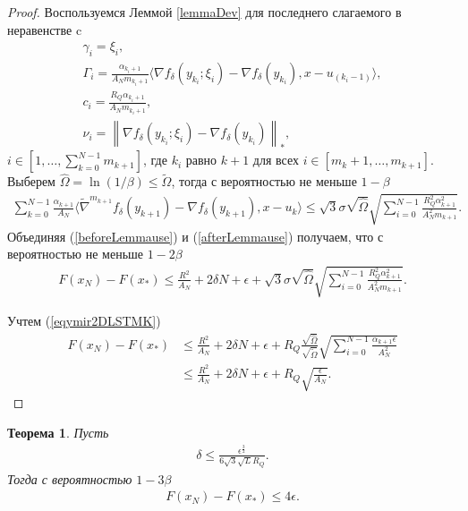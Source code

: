 \documentclass[11pt,a4]{article}
\newcommand{\norm}[1]{\left\lVert#1\right\rVert}
\newtheorem{theorem}{Теорема}
\begin{document}
\begin{proof}
	Воспользуемся Леммой \ref{lemmaDev} для последнего слагаемого в неравенстве c \begin{gather*}
	\gamma_i =\xi_i,\\
	\Gamma_i = \frac{\alpha_{k_i+1}}{A_N m_{k_i+1}}\langle\nabla f_\delta(y_{k_i};\xi_i) - \nabla f_\delta(y_{k_i}), x - u_{(k_i - 1)}\rangle,\\
	 c_{i} = \frac{R_Q\alpha_{k_i+1}}{A_N m_{k_i+1}},\\
	 \nu_i = \norm{\nabla f_\delta(y_{k_i};\xi_i) - \nabla f_\delta(y_{k_i})}_*,\end{gather*} 
	$i \in [1,\dots,\sum_{k=0}^{N-1}m_{k+1}]$, где $k_i$ равно $k + 1$ для всех $i \in [m_{k} + 1,\dots, m_{k+1}]$. Выберем $\widehat{\Omega} = \ln(1/\beta) \leq \widetilde{\Omega}$, тогда с вероятностью не меньше $1 - \beta$
	\begin{align}
	\label{afterLemmause}
	\sum_{k = 0}^{N-1}\frac{\alpha_{k+1}}{A_N}\langle \widetilde{\nabla}^{m_{k+1}} f_\delta(y_{k+1})-\nabla f_\delta(y_{k+1}), x - u_k \rangle \leq \sqrt{3}\sigma\sqrt{\widehat{\Omega}}\sqrt{\sum_{i=0}^{N-1}\frac{R_Q^2\alpha^2_{k+1}}{A_N^2m_{k+1}}}.
	\end{align}
	Объединяя (\ref{beforeLemmause}) и (\ref{afterLemmause}) получаем, что с вероятностью не меньше $1 - 2\beta$
	\begin{gather*}
	F(x_N) - F(x_*)\leq \frac{R^2}{A_{N}} + 2\delta N + \epsilon + \sqrt{3}\sigma\sqrt{\widehat{\Omega}}\sqrt{\sum_{i=0}^{N-1}\frac{R_Q^2\alpha^2_{k+1}}{A_N^2m_{k+1}}}.
	\end{gather*}
	
	Учтем (\ref{eqymir2DLSTMK})
	\begin{align*}
	F(x_N) - F(x_*)&\leq \frac{R^2}{A_{N}} + 2\delta N + \epsilon + R_Q\frac{\sqrt{\widehat{\Omega}}}{\sqrt{\widetilde{\Omega}}}\sqrt{\sum_{i=0}^{N-1}\frac{\alpha_{k+1}\epsilon}{A_N^2}}\\
	&\leq \frac{R^2}{A_{N}} + 2\delta N + \epsilon + R_Q\sqrt{\frac{\epsilon}{A_N}}.
	\end{align*}
	
\end{proof}

\begin{theorem}
\label{mainTheoremDLST2}
Пусть \begin{gather*}\delta \leq \frac{\epsilon^\frac{3}{2}}{6\sqrt{3}\sqrt{L}R_Q}.\end{gather*} Тогда с вероятностью $1 - 3\beta$
\begin{gather*}
F(x_N) - F(x_*)\leq 4\epsilon.
	\end{gather*}
\end{theorem}
\end{document}
